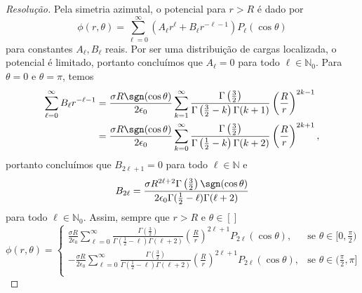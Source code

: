\begin{proof}[Resolução]
    Pela simetria azimutal, o potencial para \(r > R\) é dado por
    \begin{equation*}
        \phi(r, \theta) = \sum_{\ell = 0}^\infty \left(A_\ell r^\ell + B_\ell r^{-\ell -1}\right)P_\ell(\cos\theta)
    \end{equation*}
    para constantes \(A_\ell, B_\ell\) reais. Por ser uma distribuição de cargas localizada, o potencial é limitado, portanto concluímos que \(A_\ell = 0\) para todo \(\ell \in \mathbb{N}_0\). Para \(\theta = 0\) e \(\theta = \pi\), temos
    \begin{align*}
        \sum_{\ell = 0}^\infty B_\ell r^{-\ell - 1} &= \frac{\sigma R \sgn(\cos\theta)}{2 \epsilon_0} \sum_{k = 1}^\infty \frac{\Gamma\left(\frac32\right)}{\Gamma\left(\frac32 - k\right) \Gamma(k + 1)}\left(\frac{R}{r}\right)^{2k-1}\\
                                                    &= \frac{\sigma R\sgn(\cos\theta)}{2 \epsilon_0} \sum_{k = 0}^\infty \frac{\Gamma\left(\frac32\right)}{\Gamma\left(\frac12 - k\right) \Gamma(k + 2)}\left(\frac{R}{r}\right)^{2k+1},
    \end{align*}
    portanto concluímos que \(B_{2\ell + 1} = 0\) para todo \(\ell \in \mathbb{N}\) e
    \begin{equation*}
        B_{2\ell} = \frac{\sigma R^{2\ell + 2}\Gamma\left(\frac32\right)\sgn(\cos\theta)}{2 \epsilon_0 \Gamma(\frac12 - \ell) \Gamma(\ell+2)}
    \end{equation*}
    para todo \(\ell \in \mathbb{N}_0\). Assim, sempre que \(r > R\) e \(\theta \in []\)
    \begin{equation*}
        \phi(r, \theta) = \begin{cases}
            \displaystyle\frac{\sigma R}{2 \epsilon_0}\sum_{\ell = 0}^\infty \frac{\Gamma\left(\frac32\right)}{\Gamma\left(\frac12 - \ell\right)\Gamma(\ell + 2)} \left(\frac{R}{r}\right)^{2\ell + 1} P_{2\ell}(\cos\theta), &\text{se }\theta \in [0, \frac{\pi}{2})\\
            \displaystyle-\frac{\sigma R}{2 \epsilon_0}\sum_{\ell = 0}^\infty \frac{\Gamma\left(\frac32\right)}{\Gamma\left(\frac12 - \ell\right)\Gamma(\ell + 2)} \left(\frac{R}{r}\right)^{2\ell + 1} P_{2\ell}(\cos\theta), &\text{se }\theta \in (\frac{\pi}{2}, \pi]\\
        \end{cases}
    \end{equation*}
\end{proof}
